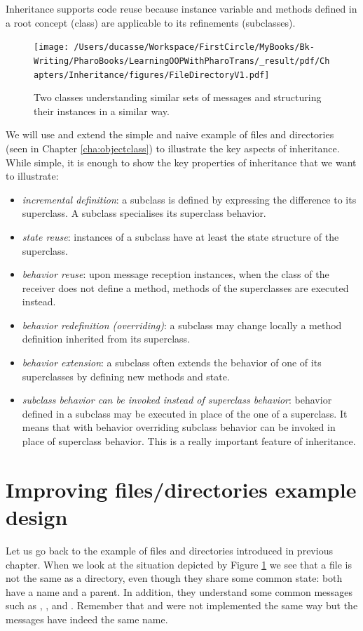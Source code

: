 \documentclass[10pt,twoside,english]{_support/latex/sbabook/sbabook}
\begin{document}
Inheritance supports code reuse because instance variable and methods defined in a root concept (class) are applicable to its refinements (subclasses).


\begin{figure}

\begin{center}
\texttt{[image: /Users/ducasse/Workspace/FirstCircle/MyBooks/Bk-Writing/PharoBooks/LearningOOPWithPharoTrans/\_result/pdf/Chapters/Inheritance/figures/FileDirectoryV1.pdf]}\caption{Two classes understanding similar sets of messages and structuring their instances in a similar way.\label{FileDirectoryV1}}\end{center}
\end{figure}


We will use and extend the simple and naive example of files and directories (seen in Chapter \ref{cha:objectclass}) to illustrate the key aspects of inheritance. While simple, it is enough to show the key properties of inheritance that we want to illustrate: 

\begin{itemize}
\item \textit{incremental definition}: a subclass is defined by expressing the difference to its superclass. A subclass specialises its superclass behavior.
\item \textit{state reuse}: instances of a subclass have at least the state structure of the superclass.
\item \textit{behavior reuse}: upon message reception instances,  when the class of the receiver does not define a method, methods of the superclasses are executed instead.
\item \textit{behavior redefinition (overriding)}: a subclass may change locally a method definition inherited from its superclass.
\item \textit{behavior extension}: a subclass often extends the behavior of one of its superclasses by defining new methods and state.
\item \textit{subclass behavior can be invoked instead of superclass behavior}: behavior defined in a subclass may be executed in place of the one of a superclass. It means that with behavior overriding subclass behavior can be invoked in place of superclass behavior. This is a really important feature of inheritance.
\end{itemize}
\section{Improving files/directories example design}
Let us go back to the example of files and directories introduced in previous chapter. 
When we look at the situation depicted by Figure \ref{FileDirectoryV1} we see that a file is not the same as a directory, even though they share some common state: both have a name and a parent. In addition, they understand some common messages such as , ,  and . Remember that  and  were not implemented the same way but the messages have indeed the same name. 
\end{document}
